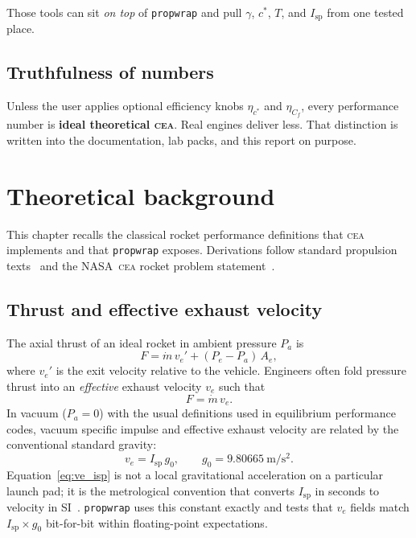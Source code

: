 \documentclass[11pt,a4paper]{report}
\newcommand{\pw}{\texttt{propwrap}}
\newcommand{\cea}{\textsc{cea}}
\newcommand{\Isp}{I_{\mathrm{sp}}}
\newcommand{\cstar}{c^{*}}
\newcommand{\Cf}{C_{f}}
\newcommand{\ve}{v_{e}}
\newcommand{\Pe}{P_{e}}
\newcommand{\Pa}{P_{a}}
\newcommand{\gzero}{g_{0}}
\begin{document}
Those tools can sit \emph{on top} of \pw{} and pull $\gamma$, $\cstar$, $T$, and
$\Isp$ from one tested place.

\section{Truthfulness of numbers}

Unless the user applies optional efficiency knobs $\eta_{c^{*}}$ and
$\eta_{\Cf}$, every performance number is \textbf{ideal theoretical \cea{}}.
Real engines deliver less. That distinction is written into the documentation,
lab packs, and this report on purpose.

\chapter{Theoretical background}
\label{ch:theory}

This chapter recalls the classical rocket performance definitions that \cea{}
implements and that \pw{} exposes. Derivations follow standard propulsion
texts~\citep{sutton2017,huzel1992} and the NASA~\cea{} rocket problem
statement~\citep{gordon1994cea}.

\section{Thrust and effective exhaust velocity}

The axial thrust of an ideal rocket in ambient pressure $\Pa$ is
\begin{equation}
  F = \dot{m}\,\ve' + (\Pe - \Pa)\,A_e,
  \label{eq:thrust}
\end{equation}
where $\ve'$ is the exit velocity relative to the vehicle. Engineers often fold
pressure thrust into an \emph{effective} exhaust velocity $\ve$ such that
\begin{equation}
  F = \dot{m}\,\ve.
  \label{eq:F_mdot_ve}
\end{equation}
In vacuum ($\Pa=0$) with the usual definitions used in equilibrium performance
codes, vacuum specific impulse and effective exhaust velocity are related by
the conventional standard gravity:
\begin{equation}
  \boxed{\ve = \Isp\,\gzero, \qquad \gzero = \SI{9.80665}{\metre\per\second\squared}.}
  \label{eq:ve_isp}
\end{equation}
Equation~\eqref{eq:ve_isp} is not a local gravitational acceleration on a
particular launch pad; it is the metrological convention that converts
$\Isp$ in seconds to velocity in SI~\citep{bipm_g0}. \pw{} uses this constant
exactly and tests that $\ve$ fields match $\Isp\times\gzero$ bit-for-bit within
floating-point expectations.
\end{document}
